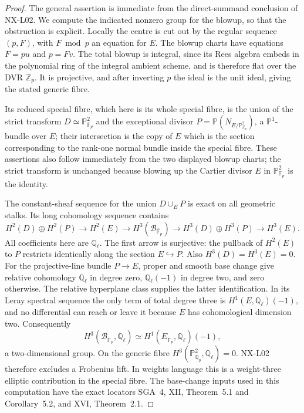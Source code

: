 \begin{proof}
The general assertion is immediate from the direct-summand conclusion
of NX-L02.  We compute the indicated nonzero group for the blowup,
so that the obstruction is explicit.  Locally the centre is cut out
by the regular sequence $(p,F)$, with $F\bmod p$ an equation for $E$.
The blowup charts have equations $F=pu$ and $p=Fv$.  The total blowup
is integral, since its Rees algebra embeds in the polynomial ring
of the integral ambient scheme, and is therefore flat over the DVR
$\mathbb Z_p$.  It is projective, and after inverting $p$ the ideal
is the unit ideal, giving the stated generic fibre.

Its reduced special fibre, which here is its whole special fibre,
is the union of the strict transform $D\simeq\mathbb P^2_{\mathbb F_p}$
and the exceptional divisor $P=\mathbb P(N_{E/\mathbb P^2_{\mathbb Z_p}})$,
a $\mathbb P^1$-bundle over $E$; their intersection is the copy of $E$
which is the section corresponding to the rank-one normal bundle
inside the special fibre.  These assertions also follow immediately
from the two displayed blowup charts; the strict transform is unchanged
because blowing up the Cartier divisor $E$ in $\mathbb P^2_{\mathbb F_p}$
is the identity.

The constant-sheaf sequence for the union $D\cup_E P$ is exact on
all geometric stalks.  Its long cohomology sequence contains
\[
 H^2(D)\oplus H^2(P)\longrightarrow H^2(E)
 \longrightarrow H^3(\mathcal B_{\overline{\mathbb F}_p})
 \longrightarrow H^3(D)\oplus H^3(P)\longrightarrow H^3(E).
\]
All coefficients here are $\mathbb Q_\ell$.  The first arrow is
surjective: the pullback of $H^2(E)$ to $P$ restricts identically along
the section $E\hookrightarrow P$.  Also $H^3(D)=H^3(E)=0$.
For the projective-line bundle $P\to E$, proper and smooth base
change give relative cohomology $\mathbb Q_\ell$ in degree zero,
$\mathbb Q_\ell(-1)$ in degree two, and zero otherwise.  The relative
hyperplane class supplies the latter identification.  In its Leray
spectral sequence the only term of total degree three is
$H^1(E,\mathbb Q_\ell)(-1)$, and no differential can reach or leave
it because $E$ has cohomological dimension two.  Consequently
\[
 H^3(\mathcal B_{\overline{\mathbb F}_p},\mathbb Q_\ell)
 \simeq H^1(E_{\overline{\mathbb F}_p},\mathbb Q_\ell)(-1),
\]
a two-dimensional group.  On the generic fibre
$H^3(\mathbb P^2_{\overline{\mathbb Q}_p},\mathbb Q_\ell)=0$.
NX-L02 therefore excludes a Frobenius lift.  In weights language this
is a weight-three elliptic contribution in the special fibre.  The
base-change inputs used in this computation have the exact locators
SGA~4, XII, Theorem~5.1 and Corollary~5.2, and XVI, Theorem~2.1.
\end{proof}

